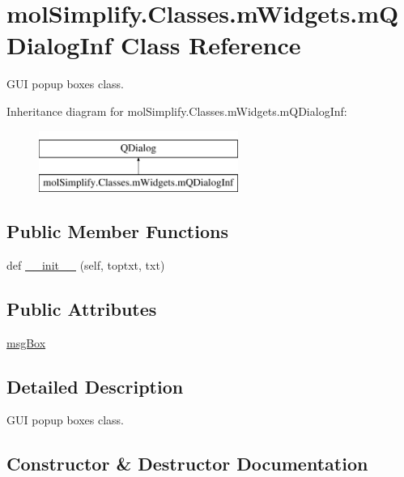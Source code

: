 \hypertarget{classmolSimplify_1_1Classes_1_1mWidgets_1_1mQDialogInf}{}\section{mol\+Simplify.\+Classes.\+m\+Widgets.\+m\+Q\+Dialog\+Inf Class Reference}
\label{classmolSimplify_1_1Classes_1_1mWidgets_1_1mQDialogInf}


G\+UI popup boxes class.  


Inheritance diagram for mol\+Simplify.\+Classes.\+m\+Widgets.\+m\+Q\+Dialog\+Inf\+:\begin{figure}[H]
\begin{center}
\leavevmode
\includegraphics[height=2.000000cm]{classmolSimplify_1_1Classes_1_1mWidgets_1_1mQDialogInf}
\end{center}
\end{figure}
\subsection*{Public Member Functions}
\begin{DoxyCompactItemize}
\item 
def \hyperlink{classmolSimplify_1_1Classes_1_1mWidgets_1_1mQDialogInf_a99b2338263f4ace549f5d873ba3bb544}{\+\_\+\+\_\+init\+\_\+\+\_\+} (self, toptxt, txt)
\end{DoxyCompactItemize}
\subsection*{Public Attributes}
\begin{DoxyCompactItemize}
\item 
\hyperlink{classmolSimplify_1_1Classes_1_1mWidgets_1_1mQDialogInf_a745462b985bfaeafa1603f5567505bd3}{msg\+Box}
\end{DoxyCompactItemize}


\subsection{Detailed Description}
G\+UI popup boxes class. 

\subsection{Constructor \& Destructor Documentation}
\mbox{\label{classmolSimplify_1_1Classes_1_1mWidgets_1_1mQDialogInf_a99b2338263f4ace549f5d873ba3bb544}} 
